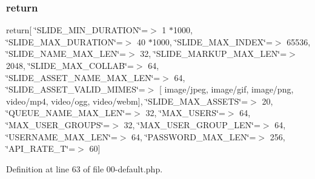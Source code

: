 \subsubsection{\texorpdfstring{return}{return}}
{\footnotesize\ttfamily return\mbox{[} \char`\"{}S\+L\+I\+D\+E\+\_\+\+M\+I\+N\+\_\+\+D\+U\+R\+A\+T\+I\+ON\char`\"{}=$>$ 1 $\ast$1000, \char`\"{}S\+L\+I\+D\+E\+\_\+\+M\+A\+X\+\_\+\+D\+U\+R\+A\+T\+I\+ON\char`\"{}=$>$ 40 $\ast$1000, \char`\"{}S\+L\+I\+D\+E\+\_\+\+M\+A\+X\+\_\+\+I\+N\+D\+EX\char`\"{}=$>$ 65536, \char`\"{}S\+L\+I\+D\+E\+\_\+\+N\+A\+M\+E\+\_\+\+M\+A\+X\+\_\+\+L\+EN\char`\"{}=$>$ 32, \char`\"{}S\+L\+I\+D\+E\+\_\+\+M\+A\+R\+K\+U\+P\+\_\+\+M\+A\+X\+\_\+\+L\+EN\char`\"{}=$>$ 2048, \char`\"{}S\+L\+I\+D\+E\+\_\+\+M\+A\+X\+\_\+\+C\+O\+L\+L\+AB\char`\"{}=$>$ 64, \char`\"{}S\+L\+I\+D\+E\+\_\+\+A\+S\+S\+E\+T\+\_\+\+N\+A\+M\+E\+\_\+\+M\+A\+X\+\_\+\+L\+EN\char`\"{}=$>$ 64, \char`\"{}S\+L\+I\+D\+E\+\_\+\+A\+S\+S\+E\+T\+\_\+\+V\+A\+L\+I\+D\+\_\+\+M\+I\+M\+ES\char`\"{}=$>$ \mbox{[} \textquotesingle{}image/jpeg\textquotesingle{}, \textquotesingle{}image/gif\textquotesingle{}, \textquotesingle{}image/png\textquotesingle{}, \textquotesingle{}video/mp4\textquotesingle{}, \textquotesingle{}video/ogg\textquotesingle{}, \textquotesingle{}video/webm\textquotesingle{}\mbox{]}, \char`\"{}S\+L\+I\+D\+E\+\_\+\+M\+A\+X\+\_\+\+A\+S\+S\+E\+TS\char`\"{}=$>$ 20, \char`\"{}Q\+U\+E\+U\+E\+\_\+\+N\+A\+M\+E\+\_\+\+M\+A\+X\+\_\+\+L\+EN\char`\"{}=$>$ 32, \char`\"{}M\+A\+X\+\_\+\+U\+S\+E\+RS\char`\"{}=$>$ 64, \char`\"{}M\+A\+X\+\_\+\+U\+S\+E\+R\+\_\+\+G\+R\+O\+U\+PS\char`\"{}=$>$ 32, \char`\"{}M\+A\+X\+\_\+\+U\+S\+E\+R\+\_\+\+G\+R\+O\+U\+P\+\_\+\+L\+EN\char`\"{}=$>$ 64, \char`\"{}U\+S\+E\+R\+N\+A\+M\+E\+\_\+\+M\+A\+X\+\_\+\+L\+EN\char`\"{}=$>$ 64, \char`\"{}P\+A\+S\+S\+W\+O\+R\+D\+\_\+\+M\+A\+X\+\_\+\+L\+EN\char`\"{}=$>$ 256, \char`\"{}A\+P\+I\+\_\+\+R\+A\+T\+E\+\_\+T\char`\"{}=$>$ 60\mbox{]}}



Definition at line 63 of file 00-\/default.\+php.

